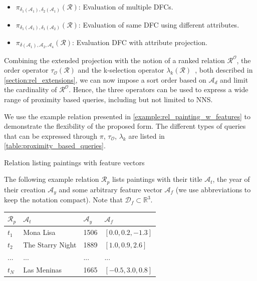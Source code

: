 \begin{itemize}
    \item $\pi_{\delta_1(\mathcal{A}_1), \delta_2(\mathcal{A}_1)}(\mathcal{R})$: Evaluation of multiple DFCs.
    \item $\pi_{\delta_1(\mathcal{A}_1), \delta_1(\mathcal{A}_2)}(\mathcal{R})$: Evaluation of same DFC using different attributes.
    \item $\pi_{\delta(\mathcal{A}_1), \mathcal{A}_2, \mathcal{A}_4}(\mathcal{R})$: Evaluation DFC with attribute projection.
\end{itemize}

Combining the extended projection with the notion of a ranked relation $\mathcal{R^{\mathcal{O}}}$, the order operator $\tau_{\mathcal{O}}(\mathcal{R})$ and the k-selection operator $\lambda_k(\mathcal{R})$~\cite{Chengkai:2005RankSQL}, both described in \cref{section:rel_extensions}, we can now impose a sort order based on $\mathcal{A}_d$ and limit the cardinality of $\mathcal{R}^{\mathcal{O}}$. Hence, the three operators can be used to express a wide range of proximity based queries, including but not limited to NNS.

We use the example relation presented in \cref{example:rel_painting_w_features} to demonstrate the flexibility of the proposed form. The different types of queries that can be expressed through $\pi$, $\tau_{\mathcal{O}}$, $\lambda_k$ are listed in \cref{table:proximity_based_queries}.

\begin{example}[label=example:rel_painting_w_features]{Relation listing paintings with feature vectors}{}
    
    The following example relation $\mathcal{R}_{p}$ lists paintings with their title $\mathcal{A}_{t}$, the year of their creation $\mathcal{A}_{y}$ and some arbitrary feature vector $\mathcal{A}_{f}$ (we use abbreviations to keep the notation compact). Note that $\mathcal{D}_{f} \subset \mathbb{R}^{3}$.
        
    \begin{center}
        \begin{tabular}{ l || l | l | l |}
            $\mathcal{R}_{p}$ & $\mathcal{A}_{t}$  & $\mathcal{A}_{y}$  & $\mathcal{A}_{f}$ \\ 
            \hline
            \hline
            $t_1$ & Mona Lisa & 1506 & $\left\lbrack 0.0, 0.2, -1.3 \right\rbrack$ \\
            \hline
            $t_2$ & The Starry Night & 1889 & $\left\lbrack 1.0, 0.9, 2.6 \right\rbrack$ \\
            \hline
            ... & ... & ... & ... \\
            \hline
            $t_N$ & Las Meninas & 1665 & $\left\lbrack -0.5, 3.0, 0.8 \right\rbrack$ \\
            \hline
        \end{tabular}
    \end{center}
\end{example}

